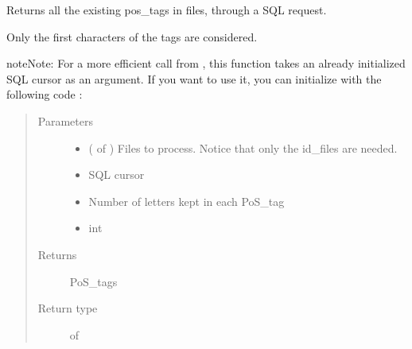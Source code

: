 \documentclass[letterpaper,10pt,english]{sphinxmanual}
\begin{document}
\begin{fulllineitems}
\label{\detokenize{analysis:loacore.analysis.frequencies.get_pos_tag_set}}
Returns all the existing pos\_tags in files, through a SQL request.

Only the first  characters of the tags are considered.

\begin{sphinxadmonition}{note}{Note:}
For a more efficient call from {\hyperref[\detokenize{analysis:loacore.analysis.frequencies.pos_tag_frequencies}]{}}, this function takes an already initialized SQL
cursor as an argument.
If you want to use it, you can initialize  with the following code :

%
\begin{sphinxVerbatim}[commandchars=\\\{\}]
   
   
  
  
\end{sphinxVerbatim}
\end{sphinxadmonition}
\begin{quote}\begin{description}
\item[{Parameters}] \leavevmode\begin{itemize}
\item {} 
 ( of ) \textendash{} Files to process. Notice that only the id\_files are needed.

\item {} 
 \textendash{} SQL cursor

\item {} 
 \textendash{} Number of letters kept in each PoS\_tag

\item {} 
 \textendash{} int

\end{itemize}

\item[{Returns}] \leavevmode
PoS\_tags

\item[{Return type}] \leavevmode
{} of 

\end{description}\end{quote}

\end{fulllineitems}
\end{document}
